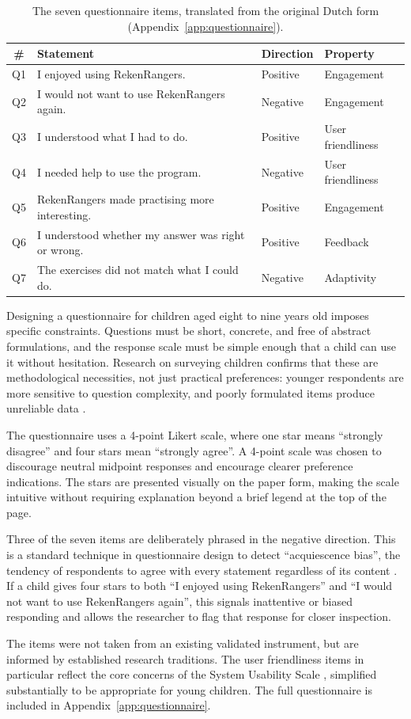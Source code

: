 \begin{table}[ht]
\centering
\caption{The seven questionnaire items, translated from the original Dutch form (Appendix~\ref{app:questionnaire}).}
\label{tab:questionnaire}
\begin{tabularx}{\textwidth}{@{}cXll@{}}
\toprule
\# & Statement & Direction & Property \\
\midrule
Q1 & I enjoyed using RekenRangers. & Positive & Engagement \\
Q2 & I would not want to use RekenRangers again. & Negative & Engagement \\
Q3 & I understood what I had to do. & Positive & User friendliness \\
Q4 & I needed help to use the program. & Negative & User friendliness \\
Q5 & RekenRangers made practising more interesting. & Positive & Engagement \\
Q6 & I understood whether my answer was right or wrong. & Positive & Feedback \\
Q7 & The exercises did not match what I could do. & Negative & Adaptivity \\
\bottomrule
\end{tabularx}
\end{table}

Designing a questionnaire for children aged eight to nine years old imposes specific constraints. Questions must be short, concrete, and free of abstract formulations, and the response scale must be simple enough that a child can use it without hesitation. Research on surveying children confirms that these are methodological necessities, not just practical preferences: younger respondents are more sensitive to question complexity, and poorly formulated items produce unreliable data \cite{borgers2000children}.

The questionnaire uses a 4-point Likert scale, where one star means ``strongly disagree'' and four stars mean ``strongly agree''. A 4-point scale was chosen to discourage neutral midpoint responses and encourage clearer preference indications. The stars are presented visually on the paper form, making the scale intuitive without requiring explanation beyond a brief legend at the top of the page.

Three of the seven items are deliberately phrased in the negative direction. This is a standard technique in questionnaire design to detect ``acquiescence bias'', the tendency of respondents to agree with every statement regardless of its content \cite{podsakoff2003common}. If a child gives four stars to both ``I enjoyed using RekenRangers'' and ``I would not want to use RekenRangers again'', this signals inattentive or biased responding and allows the researcher to flag that response for closer inspection.

The items were not taken from an existing validated instrument, but are informed by established research traditions. The user friendliness items in particular reflect the core concerns of the System Usability Scale \cite{brooke1996sus}, simplified substantially to be appropriate for young children. The full questionnaire is included in Appendix~\ref{app:questionnaire}.

